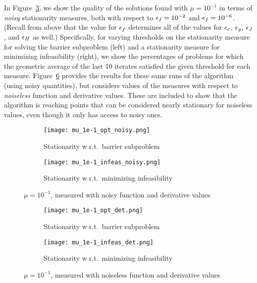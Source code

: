 In Figure~\ref{fig:mu_1e-1_noisy}, we show the quality of the solutions found with $\mu = 10^{-1}$ in terms of \emph{noisy} stationarity measures, both with respect to $\epsilon_f = 10^{-2}$ and $\epsilon_f = 10^{-6}$.  (Recall from above that the value for $\epsilon_f$ determines all of the values for $\epsilon_c$, $\epsilon_g$, $\epsilon_J$, and $\epsilon_H$ as well.)  Specifically, for varying thresholds on the stationarity measure for solving the barrier subproblem (left) and a stationarity measure for minimizing infeasibility (right), we show the percentages of problems for which the geometric average of the last 10 iterates satisfied the given threshold for each measure.  Figure~\ref{fig:mu_1e-1_det} provides the results for these same runs of the algorithm (using noisy quantities), but considers values of the measures with respect to \emph{noiseless} function and derivative values.  These are included to show that the algorithm is reaching points that can be considered nearly stationary for noiseless values, even though it only has access to noisy ones.

\begin{figure}[ht]
\centering
\begin{subfigure}{.5\textwidth}
  \centering
  \texttt{[image: mu\_1e-1\_opt\_noisy.png]}
  \caption{Stationarity w.r.t.~barrier subproblem}
  \label{fig:opt_mu_1e-1_noisy}
\end{subfigure}%
\begin{subfigure}{.5\textwidth}
  \centering
  \texttt{[image: mu\_1e-1\_infeas\_noisy.png]}
  \caption{Stationarity w.r.t.~minimizing infeasibility}
  \label{fig:infeas_mu_1e-1_noisy}
\end{subfigure}
\caption{$\mu=10^{-1}$, measured with noisy function and derivative values}
\label{fig:mu_1e-1_noisy}
\end{figure} 

\begin{figure}[ht]
\centering
\begin{subfigure}{.5\textwidth}
  \centering
  \texttt{[image: mu\_1e-1\_opt\_det.png]}
  \caption{Stationarity w.r.t.~barrier subproblem}
  \label{fig:opt_mu_1e-1_det}
\end{subfigure}%
\begin{subfigure}{.5\textwidth}
  \centering
  \texttt{[image: mu\_1e-1\_infeas\_det.png]}
  \caption{Stationarity w.r.t.~minimizing infeasibility}
  \label{fig:infeas_mu_1e-1_det}
\end{subfigure}
\caption{$\mu=10^{-1}$, measured with noiseless function and derivative values}
\label{fig:mu_1e-1_det}
\end{figure}


